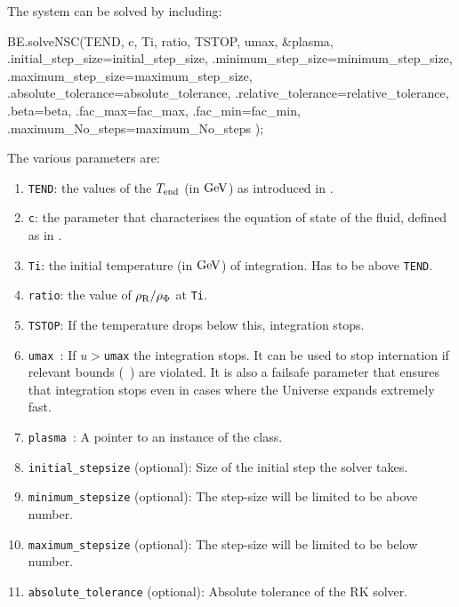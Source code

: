 \documentclass[11pt,a4paper]{article}
\begin{document}
The system can be solved by including:
%
\begin{cpp}
	BE.solveNSC(TEND, c, Ti, ratio, TSTOP, umax, &plasma,
				 	 {
					 .initial_step_size=initial_step_size, .minimum_step_size=minimum_step_size,
					 .maximum_step_size=maximum_step_size, .absolute_tolerance=absolute_tolerance, 
					 .relative_tolerance=relative_tolerance, .beta=beta, 
					 .fac_max=fac_max, .fac_min=fac_min, .maximum_No_steps=maximum_No_steps
					 }
					);
\end{cpp}
%
The various parameters are:
%
\begin{enumerate}
	\item {\tt TEND}: the values of the $T_{\rm end}{}$ (in ${\rm GeV}$) as introduced in . 
	
	\item {\tt c}: the parameter that characterises the equation of state of the fluid, defined as in .
	
	\item {\tt Ti}: the initial temperature (in ${\rm GeV}$) of integration. Has to be above {\tt TEND}.
	
	\item {\tt ratio}: the value of $\rho_{\rm R}/\rho_{\Phi}$ at {\tt Ti}. 
	
	\item {\tt TSTOP}: If the temperature drops below this, integration stops. 
	
	\item {\tt umax }: If $u>${\tt umax} the integration stops. It can be used to stop internation if relevant bounds (\eg~\cite{Planck:2018jri}) are violated. It is also a failsafe parameter that ensures that integration stops even in cases where the Universe expands extremely fast.
	
	\item {\tt plasma }: A pointer to an instance of the  class.
	
	\item {\tt initial\_stepsize} (optional): Size of the initial step the solver takes. 
	
	\item {\tt minimum\_stepsize} (optional): The step-size will be limited to be above number. 
	
	\item {\tt maximum\_stepsize} (optional): The step-size will be limited to be below number. 
	
	\item {\tt absolute\_tolerance} (optional): Absolute tolerance of the RK solver.
	

\end{enumerate}
\end{document}
